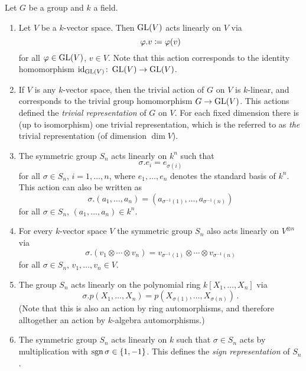 \begin{example}
  Let $G$ be a group and $k$ a field.
  \begin{enumerate}
    \item
      Let $V$ be a $k$-vector space.
      Then $\operatorname{GL}(V)$ acts linearly on $V$ via
      \[
                  \varphi.v
        \coloneqq  \varphi(v)
      \]
      for all $\varphi \in \operatorname{GL}(V)$, $v \in V$.
      Note that this action corresponds to the identity homomorphism $\operatorname{id}_{\operatorname{GL}(V)} \colon \operatorname{GL}(V) \to \operatorname{GL}(V)$.
    \item
      If $V$ is any $k$-vector space, then the trivial action of $G$ on $V$ is $k$-linear, and corresponds to the trivial group homomorphism $G \to \operatorname{GL}(V)$.
      This actions defined the \emph{trivial representation} of $G$ on $V$.
      For each fixed dimension there is (up to isomorphism) one trivial representation, which is the referred to as \emph{the} trivial representation (of dimension $\dim V$).
    \item
      The symmetric group $S_n$ acts linearly on $k^n$ such that
      \[
        \sigma.e_i = e_{\sigma(i)}
      \]
      for all $\sigma \in S_n$, $i = 1, \dotsc, n$, where $e_1, \dotsc, e_n$ denotes the standard basis of $k^n$.
      This action can also be written as
      \[
          \sigma.(a_1, \dotsc, a_n)
        = ( a_{\sigma^{-1}(1)}, \dotsc, a_{\sigma^{-1}(n)} )
      \]
      for all $\sigma \in S_n$, $(a_1, \dotsc, a_n) \in k^n$.
    \item
      For every $k$-vector space $V$ the symmetric group $S_n$ also acts linearly on $V^{\otimes n}$ via
      \[
          \sigma.(v_1 \otimes \dotsb \otimes v_n)
        = v_{\sigma^{-1}(1)} \otimes \dotsb \otimes v_{\sigma^{-1}(n)}
      \]
      for all $\sigma \in S_n$, $v_1, \dotsc, v_n \in V$.
    \item
      The group $S_n$ acts linearly on the polynomial ring $k[X_1, \dotsc, X_n]$ via
      \[
          \sigma.p(X_1, \dotsc, X_n)
        = p(X_{\sigma(1)}, \dotsc, X_{\sigma(n)}) \,.
      \]
      (Note that this is also an action by ring automorphisms, and therefore alltogether an action by $k$-algebra automorphisms.)
    \item
      The symmetric group $S_n$ acts linearly on $k$ such that $\sigma \in S_n$ acts by multiplication with $\operatorname{sgn} \sigma \in \{1, -1\}$.
      This defines the \emph{sign representation} of $S_n$.
      

\end{enumerate}
\end{example}
